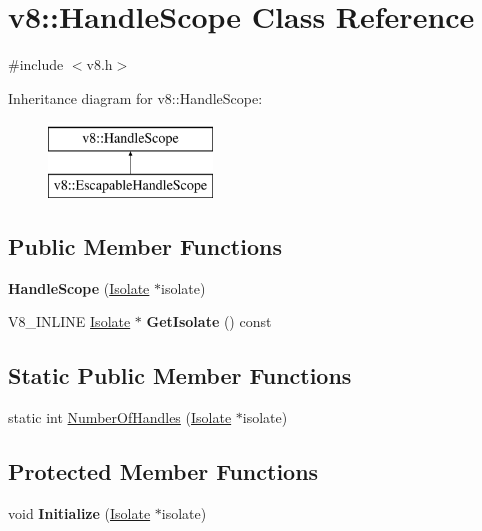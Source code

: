 \hypertarget{classv8_1_1HandleScope}{\section{v8\-:\-:Handle\-Scope Class Reference}
\label{classv8_1_1HandleScope}
}


{\ttfamily \#include $<$v8.\-h$>$}

Inheritance diagram for v8\-:\-:Handle\-Scope\-:\begin{figure}[H]
\begin{center}
\leavevmode
\includegraphics[height=2.000000cm]{classv8_1_1HandleScope}
\end{center}
\end{figure}
\subsection*{Public Member Functions}
\begin{DoxyCompactItemize}
\item 
\hypertarget{classv8_1_1HandleScope_afdb3053d852ea467f026b025ed431e79}{{\bfseries Handle\-Scope} (\hyperlink{classv8_1_1Isolate}{Isolate} $\ast$isolate)}\label{classv8_1_1HandleScope_afdb3053d852ea467f026b025ed431e79}

\item 
\hypertarget{classv8_1_1HandleScope_a15d1a1e76d8cd8a10d3947c3ca2e8a8d}{V8\-\_\-\-I\-N\-L\-I\-N\-E \hyperlink{classv8_1_1Isolate}{Isolate} $\ast$ {\bfseries Get\-Isolate} () const }\label{classv8_1_1HandleScope_a15d1a1e76d8cd8a10d3947c3ca2e8a8d}

\end{DoxyCompactItemize}
\subsection*{Static Public Member Functions}
\begin{DoxyCompactItemize}
\item 
static int \hyperlink{classv8_1_1HandleScope_abab7214c9b9388b02f575fd5270b7e2f}{Number\-Of\-Handles} (\hyperlink{classv8_1_1Isolate}{Isolate} $\ast$isolate)
\end{DoxyCompactItemize}
\subsection*{Protected Member Functions}
\begin{DoxyCompactItemize}
\item 
\hypertarget{classv8_1_1HandleScope_a7bb8631c1c8756b05e9232b8414dd992}{void {\bfseries Initialize} (\hyperlink{classv8_1_1Isolate}{Isolate} $\ast$isolate)}\label{classv8_1_1HandleScope_a7bb8631c1c8756b05e9232b8414dd992}

\end{DoxyCompactItemize}
